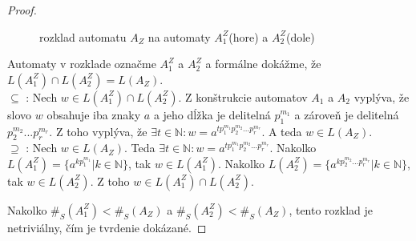 \begin{proof}
\begin{figure}[H]
\centering
{}
\caption{rozklad automatu $ A_Z $ na automaty $ A_1^Z $(hore) a $ A_2^Z $(dole)} \label{fig:dec_An}
\end{figure}

Automaty v rozklade označme $ A_1^Z $ a $ A_2^Z $ a formálne dokážme, že $ L(A_1^Z) \cap L(A_2^Z) = L(A_Z) $. \\
$ \subseteq $ : Nech $ w \in L(A_1^Z) \cap L(A_2^Z)$. Z konštrukcie automatov $ A_1 $ a $ A_2 $ vyplýva, že slovo $ w $ obsahuje iba znaky $ a $ a jeho dĺžka je delitelná $ p_{1}^{m_1} $ a zároveň je delitelná $p_{2}^{m_2}...p_{r}^{m_r} $. Z toho vyplýva, že $ \exists t \in \mathbb{N}: w = a^{tp_{1}^{m_1}p_{2}^{m_2}...p_{r}^{m_r}} $. A teda $ w \in L(A_Z) $. \\
$ \supseteq $ : Nech $ w \in L(A_Z)$. Teda $ \exists t \in \mathbb{N}: w = a^{tp_{1}^{m_1}p_{2}^{m_2}...p_{r}^{m_r}} $. Nakolko $ L(A_1^Z) = \lbrace a^{kp_{1}^{m_1}} | k \in \mathbb{N} \rbrace $, tak $ w \in L(A_1^Z) $. Nakolko $ L(A_2^Z) = \lbrace a^{kp_{2}^{m_2}...p_{r}^{m_r}} | k \in \mathbb{N} \rbrace $, tak $ w \in L(A_2^Z) $. Z toho $ w \in L(A_1^Z) \cap L(A_2^Z)$.
\par
Nakolko $ \#_{S}(A_1^Z) < \#_{S}(A_Z) $ a $ \#_{S}(A_2^Z) < \#_{S}(A_Z) $, tento rozklad je netriviálny, čím je tvrdenie dokázané.

\end{proof}

